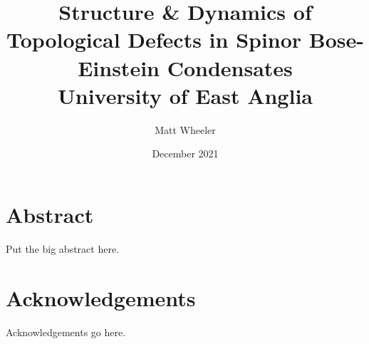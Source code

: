 \documentclass[twoside]{report}
\title{Structure \& Dynamics of Topological Defects in Spinor Bose-Einstein
Condensates\\
{\Large University of East Anglia}}
\author{Matt Wheeler}
\date{December 2021}
\begin{document}
\maketitle

\chapter*{Abstract}
Put the big abstract here.

\chapter*{Acknowledgements}
Acknowledgements go here.

\tableofcontents









\appendix


\printbibliography{}
\end{document}
